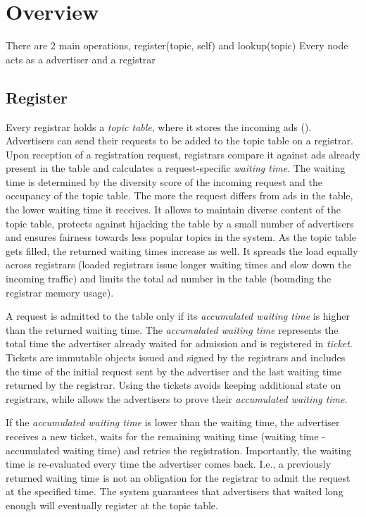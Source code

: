 
\section{Overview}

There are 2 main operations, register(topic, self) and lookup(topic)
Every node acts as a advertiser and a registrar

\subsection{Register}
Every registrar holds a \emph{topic table}, where it stores the incoming ads (). Advertisers can send their requests to be added to the topic table on a registrar. Upon reception of a registration request, registrars compare it against ads already present in the table and calculates a request-specific \emph{waiting time}. The waiting time is determined by the diversity score of the incoming request and the occupancy of the topic table. The more the request differs from ads in the table, the lower waiting time it receives. It allows to maintain diverse content of the topic table, protects against hijacking the table by a small number of advertisers and ensures fairness towards less popular topics in the system. As the topic table gets filled, the returned waiting times increase as well. It spreads the load equally across registrars (loaded registrars issue longer waiting times and slow down the incoming traffic) and limits the total ad number in the table (bounding the registrar memory usage). 

A request is admitted to the table only if its \emph{accumulated waiting time} is higher than the returned waiting time. The \emph{accumulated waiting time} represents the total time the advertiser already waited for admission and is registered in \emph{ticket}. Tickets are immutable objects issued and signed by the registrars and includes the time of the initial request sent by the advertiser and the last waiting time returned by the registrar. Using the tickets avoids keeping additional state on registrars, while allows the advertisers to prove their \emph{accumulated waiting time}. 

If the \emph{accumulated waiting time} is lower than the waiting time, the advertiser receives a new ticket, waits for the remaining waiting time (waiting time - accumulated waiting time) and retries the registration. Importantly, the waiting time is re-evaluated every time the advertiser comes back. I.e., a previously returned waiting time is not an obligation for the registrar to admit the request at the specified time. The system guarantees that advertisers that waited long enough will eventually register at the topic table. 

